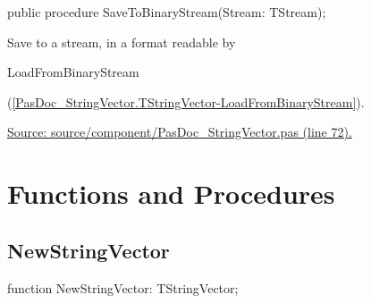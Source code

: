 \documentclass{report}
\newif\ifpdf
\begin{document}
\label{PasDoc_StringVector.TStringVector-SaveToBinaryStream}
\begin{list}{}{
\setlength{\itemindent}{0cm}
\setlength{\listparindent}{0cm}
\setlength{\leftmargin}{\evensidemargin}
\addtolength{\leftmargin}{\tmplength}
\settowidth{\labelsep}{X}
\addtolength{\leftmargin}{\labelsep}
\setlength{\labelwidth}{\tmplength}
}
\item[\textbf{Declaration}\hfill]
\ifpdf
\begin{flushleft}
\fi
\begin{ttfamily}
public procedure SaveToBinaryStream(Stream: TStream);\end{ttfamily}

\ifpdf
\end{flushleft}
\fi

\par
\item[\textbf{Description}]
Save to a stream, in a format readable by \begin{ttfamily}LoadFromBinaryStream\end{ttfamily}(\ref{PasDoc_StringVector.TStringVector-LoadFromBinaryStream}).\par
\href{https://github.com/pasdoc/pasdoc/blob/master/source/component/PasDoc_StringVector.pas#L72}{Source: source/component/PasDoc{\_}StringVector.pas (line 72).}

\end{list}
\section{Functions and Procedures}
\ifpdf
\subsection*{\large{\textbf{NewStringVector}}\normalsize\hspace{1ex}\hrulefill}
\else
\subsection*{NewStringVector}
\fi
\label{PasDoc_StringVector-NewStringVector}
\begin{list}{}{
\setlength{\itemindent}{0cm}
\setlength{\listparindent}{0cm}
\setlength{\leftmargin}{\evensidemargin}
\addtolength{\leftmargin}{\tmplength}
\settowidth{\labelsep}{X}
\addtolength{\leftmargin}{\labelsep}
\setlength{\labelwidth}{\tmplength}
}
\item[\textbf{Declaration}\hfill]
\ifpdf
\begin{flushleft}
\fi
\begin{ttfamily}
function NewStringVector: TStringVector;\end{ttfamily}

\ifpdf
\end{flushleft}
\fi

\end{list}
\ifpdf
\end{document}
